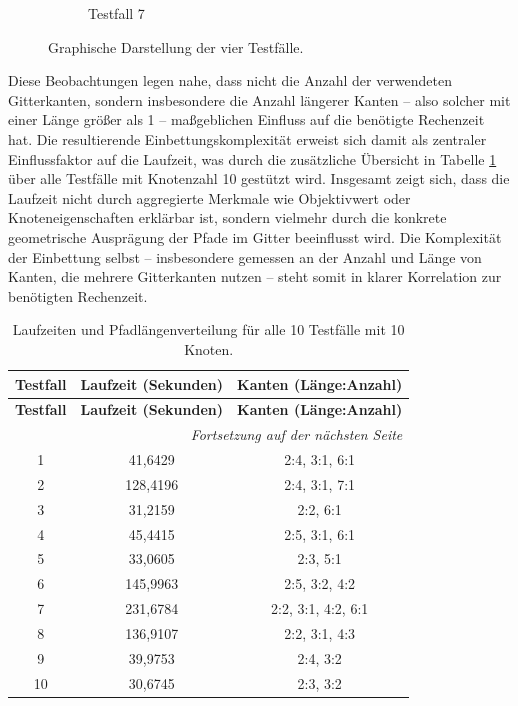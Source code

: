 \documentclass[bachelor, german]{algothesis}
\begin{document}
\begin{figure}[H]
\begin{subfigure}[b]{0.4\textwidth}
        \caption{Testfall 7}
        \label{fig:teilbild_d}
    \end{subfigure}
    \hfill
    \caption{Graphische Darstellung der vier Testfälle.}
    \label{fig:gesamtabbildung}
\end{figure}


Diese Beobachtungen legen nahe, dass nicht die Anzahl der verwendeten Gitterkanten, sondern insbesondere die Anzahl längerer Kanten – also solcher mit einer Länge größer als 1 – maßgeblichen Einfluss auf die benötigte Rechenzeit hat. Die resultierende Einbettungskomplexität erweist sich damit als zentraler Einflussfaktor auf die Laufzeit, was durch die zusätzliche Übersicht in Tabelle \ref{tab:tabpa} über alle Testfälle mit Knotenzahl 10 gestützt wird.\newline 
Insgesamt zeigt sich, dass die Laufzeit nicht durch aggregierte Merkmale wie Objektivwert oder Knoteneigenschaften erklärbar ist, sondern vielmehr durch die konkrete geometrische Ausprägung der Pfade im Gitter beeinflusst wird. Die Komplexität der Einbettung selbst – insbesondere gemessen an der Anzahl und Länge von Kanten, die mehrere Gitterkanten nutzen – steht somit in klarer Korrelation zur benötigten Rechenzeit.\newline 


\begin{longtable}{|c|c|c|}
\caption{Laufzeiten und Pfadlängenverteilung für alle 10 Testfälle mit 10 Knoten.} \label{tab:tabpa} \\
\hline
\textbf{Testfall} & \textbf{Laufzeit (Sekunden)} & \textbf{Kanten (Länge:Anzahl)} \\
\hline
\endfirsthead

\hline
\textbf{Testfall} & \textbf{Laufzeit (Sekunden)} & \textbf{Kanten (Länge:Anzahl)} \\
\hline
\endhead

\hline
\multicolumn{3}{|r|}{\textit{Fortsetzung auf der nächsten Seite}} \\
\hline
\endfoot

\hline
\endlastfoot

1 & 41,6429 & 2:4, 3:1, 6:1 \\
2 & 128,4196 & 2:4, 3:1, 7:1 \\
3 & 31,2159 & 2:2, 6:1 \\
4 & 45,4415 & 2:5, 3:1, 6:1 \\
5 & 33,0605 & 2:3, 5:1 \\
6 & 145,9963 & 2:5, 3:2, 4:2 \\
7 & 231,6784 & 2:2, 3:1, 4:2, 6:1 \\
8 & 136,9107 & 2:2, 3:1, 4:3 \\
9 & 39,9753 & 2:4, 3:2 \\
10 & 30,6745 & 2:3, 3:2 \\
\end{longtable}
\end{document}
